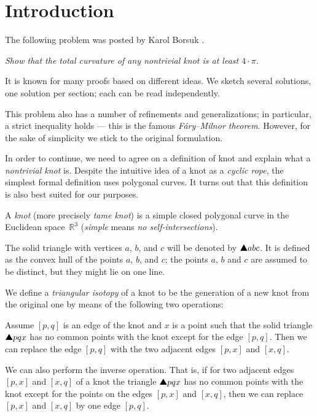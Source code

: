 \section*{Introduction}

The following problem was posted by Karol Borsuk \cite{borsuk}.

\smallskip

\textit{Show that the total curvature of any nontrivial knot is at least $4\cdot\pi$.}

\smallskip

It is known for many proofs based on different ideas.
We sketch several solutions, one solution per section;
each can be read independently.

This problem also has a number of refinements and generalizations;
in particular, a strict inequality holds --- this is the famous \emph{F\'ary--Milnor theorem}.
However, for the sake of simplicity we stick to the original formulation.

In order to continue, we need to agree on a definition of knot and explain what a \emph{nontrivial knot} is.
Despite the intuitive idea of a knot as a \emph{cyclic rope},
the simplest formal definition uses polygonal curves.
It turns out that this definition is also best suited for our purposes.

A \emph{knot} (more precisely \emph{tame knot}) is a simple closed polygonal curve in the Euclidean space~$\mathbb{R}^3$ (\emph{simple} means \emph{no self-intersections}).

The solid triangle with vertices $a$, $b$, and $c$ will be denoted by $\solidtriangle abc$.
It is defined as the convex hull of the points $a$, $b$, and $c$;
the points $a$, $b$ and $c$ are assumed to be distinct, but they might lie on one line.

We define a \emph{triangular isotopy} of a knot to be the generation of a new knot from the original one by means of the
following two operations:

Assume $[p,q]$ is an edge of the knot and $x$
is a point such that the solid triangle $\solidtriangle pqx$  has no common points with the knot except for the edge $[p,q]$.
Then we can replace the edge $[p,q]$ with the two adjacent edges $[p,x]$ and $[x,q]$.

We can also perform the inverse operation.
That is, if for two adjacent edges $[p,x]$ and $[x,q]$ of a knot the triangle
$\solidtriangle pqx$ has no common points with the knot except for the points on the edges $[p,x]$ and $[x,q]$,
then we can replace $[p,x]$ and $[x,q]$ by one edge $[p,q]$.


